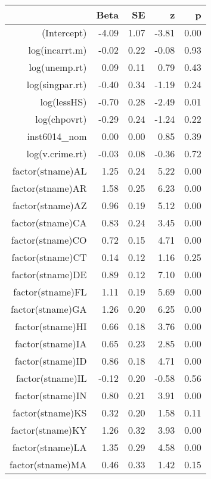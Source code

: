 \begin{table}[ht]
\centering
\begin{tabular}{rrrrr}
  \hline
 & Beta & SE & z & p \\ 
  \hline
(Intercept) & -4.09 & 1.07 & -3.81 & 0.00 \\ 
  log(incarrt.m) & -0.02 & 0.22 & -0.08 & 0.93 \\ 
  log(unemp.rt) & 0.09 & 0.11 & 0.79 & 0.43 \\ 
  log(singpar.rt) & -0.40 & 0.34 & -1.19 & 0.24 \\ 
  log(lessHS) & -0.70 & 0.28 & -2.49 & 0.01 \\ 
  log(chpovrt) & -0.29 & 0.24 & -1.24 & 0.22 \\ 
  inst6014\_nom & 0.00 & 0.00 & 0.85 & 0.39 \\ 
  log(v.crime.rt) & -0.03 & 0.08 & -0.36 & 0.72 \\ 
  factor(stname)AL & 1.25 & 0.24 & 5.22 & 0.00 \\ 
  factor(stname)AR & 1.58 & 0.25 & 6.23 & 0.00 \\ 
  factor(stname)AZ & 0.96 & 0.19 & 5.12 & 0.00 \\ 
  factor(stname)CA & 0.83 & 0.24 & 3.45 & 0.00 \\ 
  factor(stname)CO & 0.72 & 0.15 & 4.71 & 0.00 \\ 
  factor(stname)CT & 0.14 & 0.12 & 1.16 & 0.25 \\ 
  factor(stname)DE & 0.89 & 0.12 & 7.10 & 0.00 \\ 
  factor(stname)FL & 1.11 & 0.19 & 5.69 & 0.00 \\ 
  factor(stname)GA & 1.26 & 0.20 & 6.25 & 0.00 \\ 
  factor(stname)HI & 0.66 & 0.18 & 3.76 & 0.00 \\ 
  factor(stname)IA & 0.65 & 0.23 & 2.85 & 0.00 \\ 
  factor(stname)ID & 0.86 & 0.18 & 4.71 & 0.00 \\ 
  factor(stname)IL & -0.12 & 0.20 & -0.58 & 0.56 \\ 
  factor(stname)IN & 0.80 & 0.21 & 3.91 & 0.00 \\ 
  factor(stname)KS & 0.32 & 0.20 & 1.58 & 0.11 \\ 
  factor(stname)KY & 1.26 & 0.32 & 3.93 & 0.00 \\ 
  factor(stname)LA & 1.35 & 0.29 & 4.58 & 0.00 \\ 
  factor(stname)MA & 0.46 & 0.33 & 1.42 & 0.15 \\ 

\end{tabular}
\end{table}
